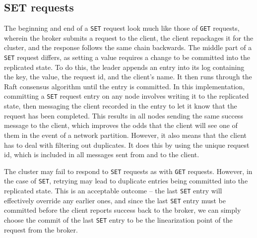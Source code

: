 \documentclass[psamsfonts]{amsart}
\begin{document}
\subsection{SET requests}
The beginning and end of a \verb|SET| request look much like those of \verb|GET| requests, wherein the broker submits a request to the client, the client repackages it for the cluster, and the response follows the same chain backwards. The middle part of a \verb|SET| request differs, as setting a value requires a change to be committed into the replicated state. To do this, the leader appends an entry into its log containing the key, the value, the request id, and the client's name. It then runs through the Raft consensus algorithm until the entry is committed. In this implementation, committing a \verb|SET| request entry on any node involves writing it to the replicated state, then messaging the client recorded in the entry to let it know that the request has been completed. This results in all nodes sending the same success message to the client, which improves the odds that the client will see one of them in the event of a network partition. However, it also means that the client has to deal with filtering out duplicates. It does this by using the unique request id, which is included in all messages sent from and to the client.

The cluster may fail to respond to \verb|SET| requests as with \verb|GET| requests. However, in the case of \verb|SET|, retrying may lead to duplicate entries being committed into the replicated state. This is an acceptable outcome -- the last \verb|SET| entry will effectively override any earlier ones, and since the last \verb|SET| entry must be committed before the client reports success back to the broker, we can simply choose the commit of the last \verb|SET| entry to be the linearization point of the request from the broker.
\end{document}
